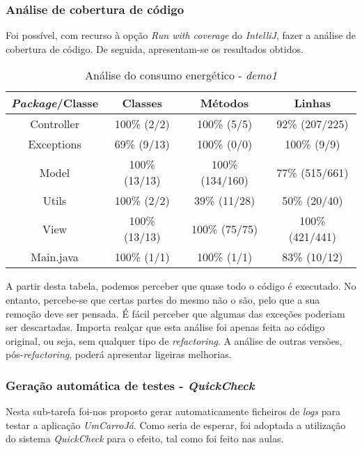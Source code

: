 \documentclass[a4paper]{report}
\begin{document}
\subsubsection{Análise de cobertura de código}
Foi possível, com recurso à opção \textit{Run with coverage} do \textit{IntelliJ}, fazer a análise de cobertura de código.
De seguida, apresentam-se os resultados obtidos.

\begin{table}[h] 
    \caption{Análise do consumo energético - \textit{demo1}}
    \begin{center}
        \begin{tabular}{ || c | c | c | c || }
        \hline
        \textbf{\textit{Package}/Classe} & \textbf{Classes} & \textbf{Métodos} & \textbf{Linhas} \\
        \hline
        \hline
        Controller & 100\% (2/2) & 100\% (5/5) & 92\% (207/225) \\
        \hline
        Exceptions & 69\% (9/13) & 100\% (0/0) & 100\% (9/9) \\
        \hline
        Model & 100\% (13/13) & 100\% (134/160) & 77\% (515/661) \\
        \hline
        Utils & 100\% (2/2) & 39\% (11/28) & 50\% (20/40) \\
        \hline
        View & 100\% (13/13) & 100\% (75/75) & 100\% (421/441) \\
        \hline
        Main.java & 100\% (1/1) & 100\% (1/1) & 83\% (10/12) \\
        \hline
        \end{tabular} 
    \end{center}
\end{table}

A partir desta tabela, podemos perceber que quase todo o código é executado. No entanto, percebe-se que certas partes do mesmo não o são, pelo que a sua remoção deve ser pensada.
É fácil perceber que algumas das exceções poderiam ser descartadas. Importa realçar que esta análise foi apenas feita ao código original, ou seja, sem qualquer tipo de \textit{refactoring}. 
A análise de outras versões, pós-\textit{refactoring}, poderá apresentar ligeiras melhorias.

\subsubsection{Geração automática de testes - \textit{QuickCheck}} \label{sssec:QuickCheckDemo1}
Nesta sub-tarefa foi-nos proposto gerar automaticamente ficheiros de \textit{logs} para testar a aplicação \textit{UmCarroJá}. Como seria de esperar, foi adoptada a utilização do sistema \textit{QuickCheck} para o efeito, tal como foi feito nas aulas.
\end{document}

